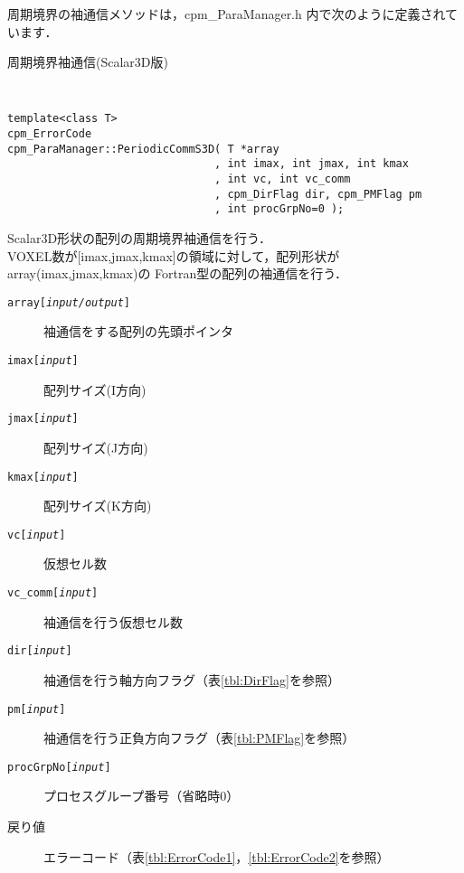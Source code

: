 周期境界の袖通信メソッドは，cpm\_ParaManager.h 内で次のように定義されています．

\begin{spacing}{0.8}
\begin{itembox}[l]{周期境界袖通信(Scalar3D版)}
{\tt
\begin{verbatim}
template<class T>
cpm_ErrorCode
cpm_ParaManager::PeriodicCommS3D( T *array
                                , int imax, int jmax, int kmax
                                , int vc, int vc_comm
                                , cpm_DirFlag dir, cpm_PMFlag pm
                                , int procGrpNo=0 );
\end{verbatim}
}
Scalar3D形状の配列の周期境界袖通信を行う．\\
VOXEL数が[imax,jmax,kmax]の領域に対して，配列形状がarray(imax,jmax,kmax)の
Fortran型の配列の袖通信を行う．
\begin{description}
\item[{\tt array[{\it input/output}]}] 袖通信をする配列の先頭ポインタ
\item[{\tt imax[{\it input}]}] 配列サイズ(I方向)
\item[{\tt jmax[{\it input}]}] 配列サイズ(J方向)
\item[{\tt kmax[{\it input}]}] 配列サイズ(K方向)
\item[{\tt vc[{\it input}]}] 仮想セル数
\item[{\tt vc\_comm[{\it input}]}] 袖通信を行う仮想セル数
\item[{\tt dir[{\it input}]}] 袖通信を行う軸方向フラグ（表\ref{tbl:DirFlag}を参照）
\item[{\tt pm[{\it input}]}] 袖通信を行う正負方向フラグ（表\ref{tbl:PMFlag}を参照）
\item[{\tt procGrpNo[{\it input}]}] プロセスグループ番号（省略時0）
\\
\item[戻り値] エラーコード（表\ref{tbl:ErrorCode1}，\ref{tbl:ErrorCode2}を参照）
\end{description}
\end{itembox}\\
\end{spacing}

